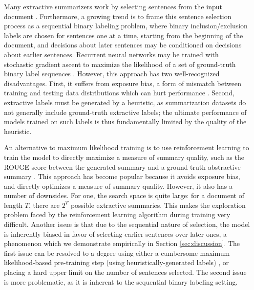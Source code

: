 \documentclass[11pt,a4paper]{article}
\begin{document}
Many extractive summarizers work by selecting sentences from the input document \citep{tra_ext1_luhn1958automatic,tra_ext3_mihalcea2004textrank,tra_ext5_wong2008extractive,ext1_kaageback2014extractive,ext2_2015Yin,ext3_cao2015learning,yasunaga2017graph}. Furthermore, a growing trend is to frame this sentence selection process as a sequential binary labeling problem, where binary inclusion/exclusion labels are chosen for sentences one at a time, starting from the beginning of the document, and decisions about later sentences may be conditioned on decisions about earlier sentences. Recurrent neural networks may be trained with stochastic gradient ascent to maximize the likelihood of a set of ground-truth binary label sequences \citep{ext4_cheng2016neural,ext5_summarunner}.
However, this approach has two well-recognized disadvantages. First, it suffers from exposure bias, a form of mismatch between training and testing data distributions which can hurt performance \citep{Ranzato2015SequenceLT, rl1_bahdanau+al-2017-actorcritic-iclr, abs5_paulus2017deep}. Second, extractive labels must be generated by a heuristic, as summarization datasets do not generally include ground-truth extractive labels; the ultimate performance of models trained on such labels is thus fundamentally limited by the quality of the heuristic.



An alternative to maximum likelihood training is to use reinforcement learning to train the model to directly maximize a measure of summary quality, such as the ROUGE score between the generated summary and a ground-truth abstractive summary \citep{DBLP:conf/aaai/WuH18}. This approach has become popular because it avoids exposure bias, and directly optimizes a measure of summary quality. However, it also has a number of downsides. For one, the search space is quite large: for a document of length $T$, there are $2^T$ possible extractive summaries. This makes the exploration problem faced by the reinforcement learning algorithm during training very difficult. Another issue is that due to the sequential nature of selection, the model is inherently biased in favor of selecting earlier sentences over later ones, a phenomenon which we demonstrate empirically in Section \ref{sec:discussion}. The first issue can be resolved to a degree using either a cumbersome maximum likelihood-based pre-training step (using heuristically-generated labels) \citep{DBLP:conf/aaai/WuH18}, or placing a hard upper limit on the number of sentences selected. The second issue is more problematic, as it is inherent to the sequential binary labeling setting.
\end{document}
